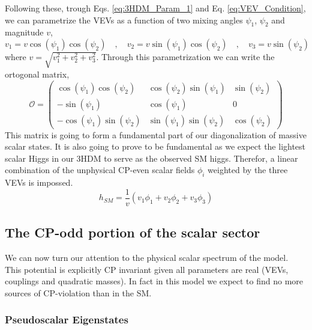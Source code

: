 Following these, trough Eqs. \ref{eq:3HDM_Param_1} and Eq. \ref{eq:VEV_Condition}, we can parametrize the VEVs as a function of two mixing angles $\psi_1$, $\psi_2$ and magnitude $v$, 
\begin{equation}
v_1 = v \cos(\psi_1) \cos(\psi_2) \quad , \quad v_2 = v \sin(\psi_1) \cos(\psi_2) \quad , \quad v_3 = v \sin(\psi_2)
\end{equation}
where $v=\sqrt{v_1^2 + v_2^2 + v_3^2 }$. Through this parametrization we can write the ortogonal matrix, 
\begin{equation}
\label{eq:3HDM_Orthg}
\mathcal{O} = 
\begin{pmatrix}
\cos(\psi_1) \cos(\psi_2) & \cos(\psi_2) \sin(\psi_1) & \sin(\psi_2) \\ 
- \sin(\psi_1) & \cos(\psi_1) & 0 \\ 
- \cos(\psi_1) \sin(\psi_2) & \sin(\psi_1) \sin(\psi_2) & \cos(\psi_2)
\end{pmatrix}
\end{equation}
%
This matrix is going to form a fundamental part of our diagonalization of massive scalar states. It is also going to prove to be fundamental as we expect the lightest scalar Higgs
in our 3HDM to serve as the observed SM higgs. Therefor, a linear combination of the unphysical CP-even scalar fields $\phi_i$ weighted by the three VEVs is impossed. 
%
\begin{equation}
h_{SM} = \frac{1}{v} \left( v_1 \phi_1 + v_2 \phi_2 + v_3 \phi_3 \right) 
\end{equation}


%
%

\subsection{The CP-odd portion of the scalar sector}

We can now turn our attention to the physical scalar spectrum of the model. 
%
This potential is explicitly CP invariant given all parameters are real (VEVs, couplings and quadratic masses). In fact in this model we expect to find no more sources of CP-violation than in the SM.

\subsubsection{Pseudoscalar Eigenstates}

